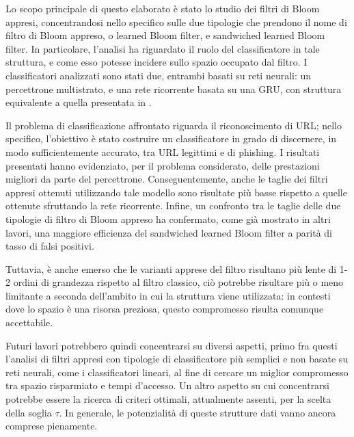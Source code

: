\documentclass[../../main.tex]{subfiles}
\begin{document}
    Lo scopo principale di questo elaborato è stato lo studio dei filtri di Bloom appresi, concentrandosi nello specifico sulle due tipologie che prendono il nome di filtro di Bloom appreso, o learned Bloom filter, e sandwiched learned Bloom filter. In particolare, l'analisi ha riguardato il ruolo del classificatore in tale struttura, e come esso potesse incidere sullo spazio occupato dal filtro. I classificatori analizzati sono stati due, entrambi basati su reti neurali: un percettrone multistrato, e una rete ricorrente basata su una GRU, con struttura equivalente a quella presentata in \cite{ma2020}. 
    
    Il problema di classificazione affrontato riguarda il riconoscimento di URL; nello specifico, l'obiettivo è stato costruire un classificatore in grado di discernere, in modo sufficientemente accurato, tra URL legittimi e di phishing. I risultati presentati hanno evidenziato, per il problema considerato, delle prestazioni migliori da parte del percettrone. Conseguentemente, anche le taglie dei filtri appresi ottenuti utilizzando tale modello sono risultate più basse rispetto a quelle ottenute sfruttando la rete ricorrente. Infine, un confronto tra le taglie delle due tipologie di filtro di Bloom appreso ha confermato, come già mostrato in altri lavori, una maggiore efficienza del sandwiched learned Bloom filter a parità di tasso di falsi positivi.

    Tuttavia, è anche emerso che le varianti apprese del filtro risultano più lente di 1-2 ordini di grandezza rispetto al filtro classico, ciò potrebbe risultare più o meno limitante a seconda dell'ambito in cui la struttura viene utilizzata: in contesti dove lo spazio è una risorsa preziosa, questo compromesso risulta comunque accettabile. 
    
    Futuri lavori potrebbero quindi concentrarsi su diversi aspetti, primo fra questi l'analisi di filtri appresi con tipologie di classificatore più semplici e non basate su reti neurali, come i classificatori lineari, al fine di cercare un miglior compromesso tra spazio risparmiato e tempi d'accesso. Un altro aspetto su cui concentrarsi potrebbe essere la ricerca di criteri ottimali, attualmente assenti, per la scelta della soglia $\tau$. In generale, le potenzialità di queste strutture dati vanno ancora comprese pienamente.
\end{document}
